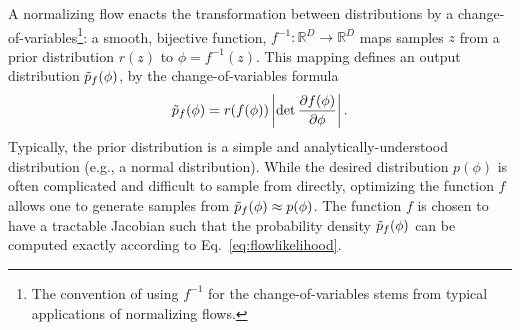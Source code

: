 A normalizing flow enacts the transformation between distributions by a change-of-variables\footnote{The convention of using $f^{-1}$ for the change-of-variables stems from typical applications of normalizing flows.}: a smooth, bijective function, $f^{-1}: \mathbb{R}^D \rightarrow \mathbb{R}^D$ maps samples $z$ from a prior distribution $r(z)$ to $\phi = f^{-1}(z)$. This mapping defines an output distribution $\tilde{p}_f(\phi)$, by the change-of-variables formula
\begin{align}
\label{eq:flowlikelihood}
\tilde{p}_f(\phi) = r(f(\phi))\left| \det  \frac{\partial f(\phi)}{\partial \phi} \right|.
\end{align}
Typically, the prior distribution is a simple and analytically-understood distribution (e.g., a normal distribution). While the desired distribution $p(\phi)$ is often complicated and difficult to sample from directly, optimizing the function $f$ allows one to generate samples from $\tilde{p}_f(\phi) \approx p(\phi)$. The function $f$ is chosen to have a tractable Jacobian such that the probability density $\tilde{p}_f(\phi)$ can be computed exactly according to Eq.~\eqref{eq:flowlikelihood}.
%




